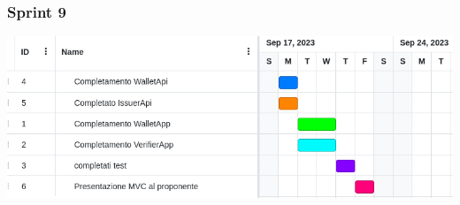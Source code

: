         \subsubsection{Sprint 9}
        \begin{center}
            \includegraphics[scale = 0.5]{./res/img/Sprint 9.png}
          \end{center}
